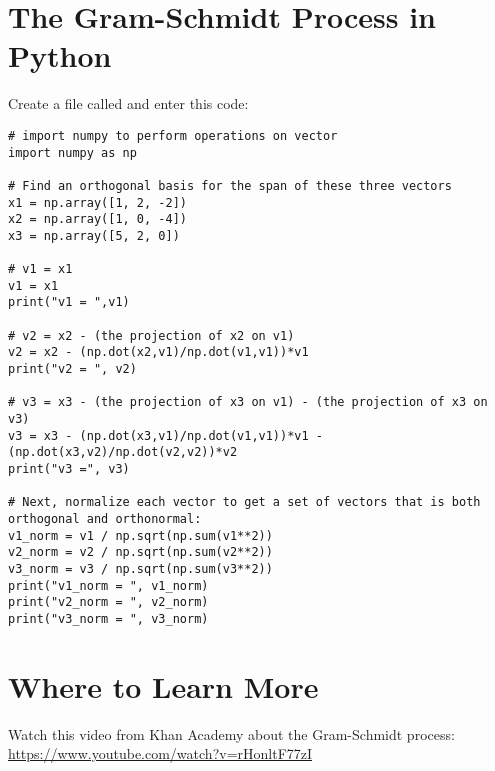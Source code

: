 \section{The Gram-Schmidt Process in Python}
Create a file called  and enter this code:
\begin{Verbatim}
# import numpy to perform operations on vector
import numpy as np

# Find an orthogonal basis for the span of these three vectors  
x1 = np.array([1, 2, -2]) 
x2 = np.array([1, 0, -4]) 
x3 = np.array([5, 2, 0])    
   
# v1 = x1
v1 = x1
print("v1 = ",v1)

# v2 = x2 - (the projection of x2 on v1)
v2 = x2 - (np.dot(x2,v1)/np.dot(v1,v1))*v1
print("v2 = ", v2)

# v3 = x3 - (the projection of x3 on v1) - (the projection of x3 on v3)
v3 = x3 - (np.dot(x3,v1)/np.dot(v1,v1))*v1 - (np.dot(x3,v2)/np.dot(v2,v2))*v2
print("v3 =", v3)

# Next, normalize each vector to get a set of vectors that is both orthogonal and orthonormal:
v1_norm = v1 / np.sqrt(np.sum(v1**2))
v2_norm = v2 / np.sqrt(np.sum(v2**2))
v3_norm = v3 / np.sqrt(np.sum(v3**2))
print("v1_norm = ", v1_norm)
print("v2_norm = ", v2_norm)
print("v3_norm = ", v3_norm)
\end{Verbatim}

\section{Where to Learn More}
Watch this video from Khan Academy about the Gram-Schmidt process: \url{https://www.youtube.com/watch?v=rHonltF77zI}
